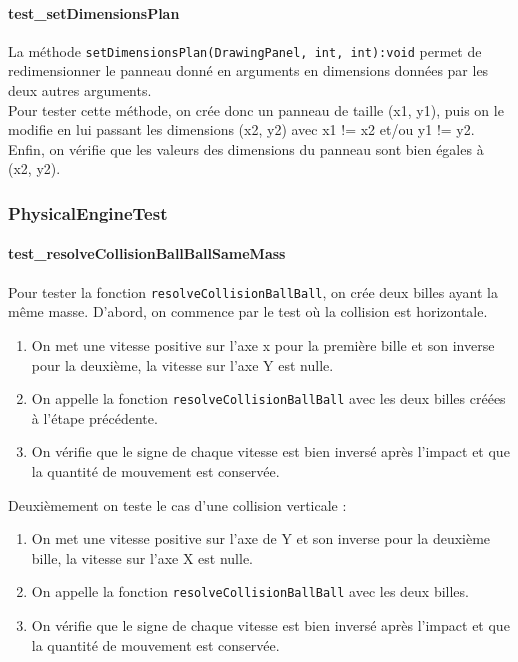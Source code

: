 \documentclass{report}
\begin{document}
\paragraph{test\_setDimensionsPlan}

La méthode \texttt{setDimensionsPlan(DrawingPanel, int, int):void} permet de redimensionner le panneau donné en arguments en dimensions données par les deux autres arguments. \\

Pour tester cette méthode, on crée donc un panneau de taille (x1, y1), puis on le modifie en lui passant les dimensions (x2, y2) avec x1 != x2 et/ou y1 != y2. Enfin, on vérifie que les valeurs des dimensions du panneau sont bien égales à (x2, y2).

\newpage
\subsubsection{PhysicalEngineTest}

\paragraph{test\_resolveCollisionBallBallSameMass}

Pour tester la fonction \texttt{resolveCollisionBallBall}, on crée deux billes ayant la même masse.
D’abord, on commence par le test où la collision est horizontale. 

\begin{enumerate}
\item On met une vitesse positive sur l’axe x pour la première bille et son inverse pour la deuxième, la vitesse sur l’axe Y est nulle.
\item On appelle la fonction \texttt{resolveCollisionBallBall} avec les deux billes créées à l’étape précédente.
\item On vérifie que le signe de chaque vitesse est bien inversé après l’impact et que la quantité de mouvement est conservée.\\
\end{enumerate}

Deuxièmement on teste le cas d’une collision verticale :

\begin{enumerate}
\item On met une vitesse positive sur l’axe de Y et son inverse pour la deuxième bille, la vitesse sur l’axe X est nulle.
\item On appelle la fonction \texttt{resolveCollisionBallBall} avec les deux billes.
\item On vérifie que le signe de chaque vitesse est bien inversé après l’impact et que la quantité de mouvement est conservée.\\
\end{enumerate}
\end{document}
